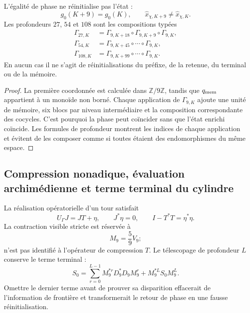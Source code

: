 \begin{theorem}
\label{gfp:b:thm:retorno-fase-conservacion-genealogica}
L’égalité de phase ne réinitialise pas l’état :
\[
 g_0(K+9)=g_0(K),
 \qquad
 \widehat x_{\chi,K+9}\ne\widehat x_{\chi,K}.
\]
Les profondeurs \(27\), \(54\) et \(108\) sont les compositions typées
\begin{align*}
 \Gamma_{27,K}
 &=\Gamma_{9,K+18}\circ\Gamma_{9,K+9}\circ\Gamma_{9,K},\\
 \Gamma_{54,K}
 &=\Gamma_{9,K+45}\circ\cdots\circ\Gamma_{9,K},\\
 \Gamma_{108,K}
 &=\Gamma_{9,K+99}\circ\cdots\circ\Gamma_{9,K}.
\end{align*}
En aucun cas il ne s’agit de réinitialisations du préfixe, de la retenue, du terminal ou de la
mémoire.
\end{theorem}

\begin{proof}
La première coordonnée est calculée dans \(\mathbb Z/9\mathbb Z\), tandis que
\(q_{\rm mem}\) appartient à un monoïde non borné. Chaque application de
\(\Gamma_{9,K}\) ajoute une unité de mémoire, six blocs par niveau
intermédiaire et la composition correspondante des cocycles. C’est pourquoi la phase
peut coïncider sans que l’état enrichi coïncide. Les formules de
profondeur montrent les indices de chaque application et évitent de les composer comme si toutes
étaient des endomorphismes du même espace.
\end{proof}

\subsection{Compression nonadique, évaluation archimédienne et terme terminal du cylindre}

La réalisation opératorielle d’un tour satisfait
\begin{equation}
 U_\Gamma J=JT+\eta,
 \qquad
 J^*\eta=0,
 \qquad
 I-T^*T=\eta^*\eta.
 \label{gfp:b:eq:compresion-expresion-precision}
\end{equation}
La contraction visible stricte est réservée à
\[
 M_9=\frac59V_9;
\]
n’est pas identifié à l’opérateur de compression \(T\). Le télescopage de
profondeur \(L\) conserve le terme terminal :
\begin{equation}
 S_0=
 \sum_{r=0}^{L-1}M_9^{*r}D_9^*D_9M_9^r
 +M_9^{*L}S_0M_9^L.
 \label{gfp:b:eq:telescopia-terminal-precision}
\end{equation}
Omettre le dernier terme avant de prouver sa disparition effacerait
de l’information de frontière et transformerait le retour de phase en une fausse
réinitialisation.

